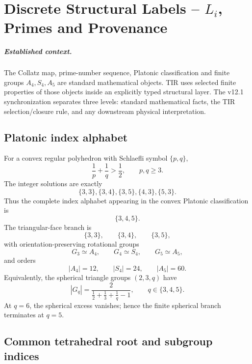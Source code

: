 \chapter[Discrete Structural Labels]{Discrete Structural Labels -- $L_i$, Primes and Provenance}
\label{ch:v12_discrete_labels}

\paragraph{Established context.}
The Collatz map, prime-number sequence, Platonic classification and finite groups
\(A_4,S_4,A_5\) are standard mathematical objects.  TIR uses selected finite
properties of those objects inside an explicitly typed structural layer.  The
v12.1 synchronization separates three levels: standard mathematical facts, the
TIR selection/closure rule, and any downstream physical interpretation.

\section{Platonic index alphabet}

For a convex regular polyhedron with Schlaefli symbol \(\{p,q\}\),
\[
\frac1p+\frac1q>\frac12,
\qquad p,q\ge3.
\]
The integer solutions are exactly
\[
\boxed{
\{3,3\},\{3,4\},\{3,5\},\{4,3\},\{5,3\}.
}
\]
Thus the complete index alphabet appearing in the convex Platonic
classification is
\[
\boxed{\{3,4,5\}}.
\]
The triangular-face branch is
\[
\{3,3\},\qquad\{3,4\},\qquad\{3,5\},
\]
with orientation-preserving rotational groups
\[
G_3\simeq A_4,
\qquad
G_4\simeq S_4,
\qquad
G_5\simeq A_5,
\]
and orders
\[
|A_4|=12,
\qquad |S_4|=24,
\qquad |A_5|=60.
\]
Equivalently, the spherical triangle groups \((2,3,q)\) have
\[
|G_q|
=\frac{2}{\frac12+\frac13+\frac1q-1},
\qquad q\in\{3,4,5\}.
\]
At \(q=6\), the spherical excess vanishes; hence the finite spherical branch
terminates at \(q=5\).

\section{Common tetrahedral root and subgroup indices}

